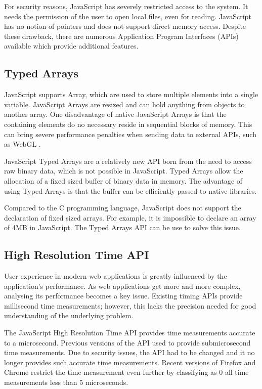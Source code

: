 \documentclass[10pt,a4paper,twoside]{book}
\begin{document}
For security reasons, JavaScript has severely restricted access to the system. It needs the permission of the user to open local files, even for reading. JavaScript has no notion of pointers and does not support direct memory access. Despite these drawback, there are numerous Application Program Interfaces (APIs) available which provide additional features.

\subsection{Typed Arrays}

JavaScript supports Array, which are used to store multiple elements into a single variable. JavaScript Arrays are  resized and can hold anything from objects to another array. One disadvantage of native JavaScript Arrays is that the containing elements do no necessary reside in sequential blocks of memory. This can bring severe performance penalties when sending data to external APIs, such as WebGL \cite{webgl}.

JavaScript Typed Arrays \cite{typedarrays} are a relatively new API born from the need to access raw binary data, which is not possible in JavaScript. Typed Arrays allow the allocation of a fixed sized buffer of binary data in memory. The advantage of using Typed Arrays is that the buffer can be efficiently passed to native libraries.

Compared to the C programming language, JavaScript does not support the declaration of fixed sized arrays. For example, it is impossible to declare an array of 4MB in JavaScript. The Typed Arrays API can be use to solve this issue.

\subsection{High Resolution Time API}

User experience in modern web applications is greatly influenced by the application's performance. As web applications get more and more complex, analysing its performance becomes a key issue. Existing timing APIs provide millisecond time measurements; however, this lacks the precision needed for good understanding of the underlying problem.

The JavaScript High Resolution Time API \cite{jshighresolutiontimeapi} provides time measurements accurate to a microsecond. Previous versions of the API used to provide submicrosecond time measurements. Due to security issues, the API had to be changed and it no longer provides such accurate time measurements. Recent versions of Firefox and Chrome restrict the time measurement even further by classifying as 0 all time measurements less than 5 microseconds.
\end{document}
